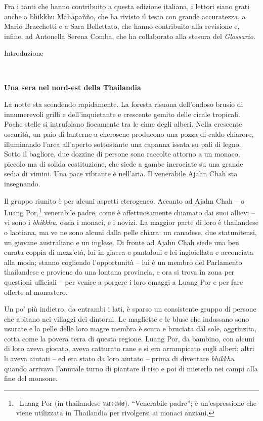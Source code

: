 Fra i tanti che hanno contribuito a questa edizione italiana, i lettori
siano grati anche a bhikkhu Mahāpañño, che ha rivisto il testo con
grande accuratezza, a Mario Bracchetti e a Sara Bellettato, che hanno
contribuito alla revisione e, infine, ad Antonella Serena Comba, che ha
collaborato alla stesura del \emph{Glossario}.

Introduzione



\textbf{Una sera nel nord-est della Thailandia}

La notte sta scendendo rapidamente. La foresta risuona dell'ondoso
brusio di innumerevoli grilli e dell'inquietante e crescente gemito
delle cicale tropicali. Poche stelle si intrufolano fiocamente tra le
cime degli alberi. Nella crescente oscurità, un paio di lanterne a
cherosene producono una pozza di caldo chiarore, illuminando l'area
all'aperto sottostante una capanna issata su pali di legno. Sotto il
bagliore, due dozzine di persone sono raccolte attorno a un monaco,
piccolo ma di solida costituzione, che siede a gambe incrociate su una
grande sedia di vimini. Una pace vibrante è nell'aria. Il venerabile
Ajahn Chah sta insegnando.

Il gruppo riunito è per alcuni aspetti eterogeneo. Accanto ad Ajahn Chah
-- o Luang Por,\footnote{~Luang Por (in thailandese หลวงพ่อ).
  ``Venerabile padre''; è un'espressione che viene utilizzata in
  Thailandia per rivolgersi ai monaci anziani.} venerabile padre, come è
affettuosamente chiamato dai suoi allievi -- vi sono i \emph{bhikkhu},
ossia i monaci, e i novizi. La maggior parte di loro è thailandese o
laotiana, ma ve ne sono alcuni dalla pelle chiara: un canadese, due
statunitensi, un giovane australiano e un inglese. Di fronte ad Ajahn
Chah siede una ben curata coppia di mezz'età, lui in giacca e pantaloni
e lei ingioiellata e acconciata alla moda; stanno cogliendo
l'opportunità -- lui è un membro del Parlamento thailandese e proviene
da una lontana provincia, e ora si trova in zona per questioni ufficiali
-- per venire a porgere i loro omaggi a Luang Por e per fare offerte al
monastero.

Un po' più indietro, da entrambi i lati, è sparso un consistente gruppo
di persone che abitano nei villaggi dei dintorni. Le magliette e le
bluse che indossano sono usurate e la pelle delle loro magre membra è
scura e bruciata dal sole, aggrinzita, cotta come la povera terra di
questa regione. Luang Por, da bambino, con alcuni di loro aveva giocato,
aveva catturato rane e si era arrampicato sugli alberi; altri li aveva
aiutati -- ed era stato da loro aiutato -- prima di diventare
\emph{bhikkhu} quando arrivava l'annuale turno di piantare il riso e poi
di mieterlo nei campi alla fine del monsone.

